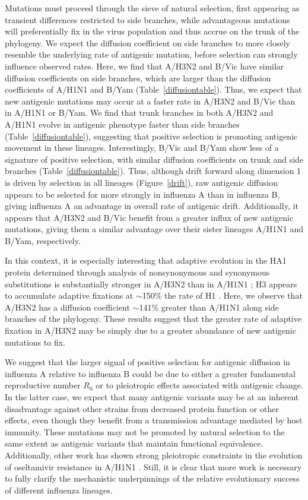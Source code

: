 \documentclass[11pt,oneside,letterpaper]{article}
\begin{document}
Mutations must proceed through the sieve of natural selection, first appearing as transient differences restricted to side branches, while advantageous mutations will preferentially fix in the virus population and thus accrue on the trunk of the phylogeny.
We expect the diffusion coefficient on side branches to more closely resemble the underlying rate of antigenic mutation, before selection can strongly influence observed rates.
Here, we find that A/H3N2 and B/Vic have similar diffusion coefficients on side branches, which are larger than the diffusion coefficients of A/H1N1 and B/Yam (Table~\ref{diffusiontable}).
Thus, we expect that new antigenic mutations may occur at a faster rate in A/H3N2 and B/Vic than in A/H1N1 or B/Yam.
We find that trunk branches in both A/H3N2 and A/H1N1 evolve in antigenic phenotype faster than side branches (Table~\ref{diffusiontable}), suggesting that positive selection is promoting antigenic movement in these lineages.
Interestingly, B/Vic and B/Yam show less of a signature of positive selection, with similar diffusion coefficients on trunk and side branches (Table~\ref{diffusiontable}).
Thus, although drift forward along dimension 1 is driven by selection in all lineages (Figure~\ref{drift}), raw antigenic diffusion appears to be selected for more strongly in influenza A than in influenza B, giving influenza A an advantage in overall rate of antigenic drift.
Additionally, it appears that A/H3N2 and B/Vic benefit from a greater influx of new antigenic mutations, giving them a similar advantage over their sister lineages A/H1N1 and B/Yam, respectively.

In this context, it is especially interesting that adaptive evolution in the HA1 protein determined through analysis of nonsynonymous and synonymous substitutions is substantially stronger in A/H3N2 than in A/H1N1 \cite{Wolf06}; H3 appears to accumulate adaptive fixations at $\sim$150\% the rate of H1 \cite{Bhatt11}.
Here, we observe that A/H3N2 has a diffusion coefficient $\sim$141\% greater than A/H1N1 along side branches of the phylogeny.
These results suggest that the greater rate of adaptive fixation in A/H3N2 may be simply due to a greater abundance of new antigenic mutations to fix.

We suggest that the larger signal of positive selection for antigenic diffusion in influenza A relative to influenza B could be due to either a greater fundamental reproductive number $R_0$ or to pleiotropic effects associated with antigenic change.
In the latter case, we expect that many antigenic variants may be at an inherent disadvantage against other strains from decreased protein function \cite{Kaverin04,Rudneva12} or other effects, even though they benefit from a transmission advantage mediated by host immunity.
These mutations may not be promoted by natural selection to the same extent as antigenic variants that maintain functional equivalence.
Additionally, other work has shown strong pleiotropic constraints in the evolution of oseltamivir resistance in A/H1N1 \cite{Bloom10}.
Still, it is clear that more work is necessary to fully clarify the mechanistic underpinnings of the relative evolutionary success of different influenza lineages.
\end{document}
